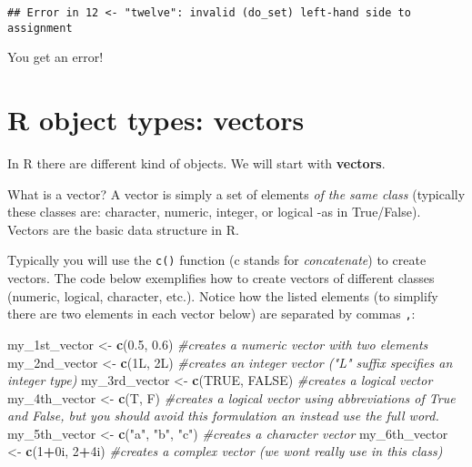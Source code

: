 \documentclass[
]{book}
\newenvironment{Shaded}{\begin{snugshade}}{\end{snugshade}}
\newcommand{\CommentTok}[1]{\textcolor[rgb]{0.56,0.35,0.01}{\textit{#1}}}
\newcommand{\ConstantTok}[1]{\textcolor[rgb]{0.56,0.35,0.01}{#1}}
\newcommand{\DataTypeTok}[1]{\textcolor[rgb]{0.13,0.29,0.53}{#1}}
\newcommand{\DecValTok}[1]{\textcolor[rgb]{0.00,0.00,0.81}{#1}}
\newcommand{\FloatTok}[1]{\textcolor[rgb]{0.00,0.00,0.81}{#1}}
\newcommand{\FunctionTok}[1]{\textcolor[rgb]{0.13,0.29,0.53}{\textbf{#1}}}
\newcommand{\NormalTok}[1]{#1}
\newcommand{\OtherTok}[1]{\textcolor[rgb]{0.56,0.35,0.01}{#1}}
\newcommand{\SpecialCharTok}[1]{\textcolor[rgb]{0.81,0.36,0.00}{\textbf{#1}}}
\newcommand{\StringTok}[1]{\textcolor[rgb]{0.31,0.60,0.02}{#1}}
\begin{document}
\begin{verbatim}
## Error in 12 <- "twelve": invalid (do_set) left-hand side to assignment
\end{verbatim}

You get an error!

\section{R object types: vectors}\label{r-object-types-vectors}

In R there are different kind of objects. We will start with \textbf{vectors}.

What is a vector? A vector is simply a set of elements \emph{of the same class} (typically these classes are: character, numeric, integer, or logical -as in True/False). Vectors are the basic data structure in R.

Typically you will use the \texttt{c()} function (c stands for \emph{concatenate}) to create vectors. The code below exemplifies how to create vectors of different classes (numeric, logical, character, etc.). Notice how the listed elements (to simplify there are two elements in each vector below) are separated by commas \texttt{,}:

\begin{Shaded}
\begin{Highlighting}[]
\NormalTok{my\_1st\_vector }\OtherTok{\textless{}{-}} \FunctionTok{c}\NormalTok{(}\FloatTok{0.5}\NormalTok{, }\FloatTok{0.6}\NormalTok{) }\CommentTok{\#creates a numeric vector with two elements}
\NormalTok{my\_2nd\_vector }\OtherTok{\textless{}{-}} \FunctionTok{c}\NormalTok{(}\DecValTok{1}\DataTypeTok{L}\NormalTok{, }\DecValTok{2}\DataTypeTok{L}\NormalTok{) }\CommentTok{\#creates an integer vector ("L" suffix specifies an integer type)}
\NormalTok{my\_3rd\_vector }\OtherTok{\textless{}{-}} \FunctionTok{c}\NormalTok{(}\ConstantTok{TRUE}\NormalTok{, }\ConstantTok{FALSE}\NormalTok{) }\CommentTok{\#creates a logical vector}
\NormalTok{my\_4th\_vector }\OtherTok{\textless{}{-}} \FunctionTok{c}\NormalTok{(T, F) }\CommentTok{\#creates a logical vector using abbreviations of True and False, but you should avoid this formulation an instead use the full word.}
\NormalTok{my\_5th\_vector }\OtherTok{\textless{}{-}} \FunctionTok{c}\NormalTok{(}\StringTok{"a"}\NormalTok{, }\StringTok{"b"}\NormalTok{, }\StringTok{"c"}\NormalTok{) }\CommentTok{\#creates a character vector}
\NormalTok{my\_6th\_vector }\OtherTok{\textless{}{-}} \FunctionTok{c}\NormalTok{(}\DecValTok{1}\SpecialCharTok{+}\DecValTok{0}\DataTypeTok{i}\NormalTok{, }\DecValTok{2}\SpecialCharTok{+}\DecValTok{4}\DataTypeTok{i}\NormalTok{) }\CommentTok{\#creates a complex vector (we won\textquotesingle{}t really use in this class)}
\end{Highlighting}
\end{Shaded}
\end{document}
